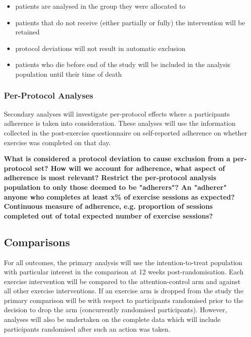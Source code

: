 \documentclass[11pt,parskip=half-]{scrartcl}
\providecommand{\tightlist}{%
  \setlength{\itemsep}{0pt}\setlength{\parskip}{0pt}}
\begin{document}
\begin{itemize}
  \tightlist
  \item patients are analysed in the group they were allocated to
  \item patients that do not receive (either partially or fully) the intervention will be retained
  \item protocol deviations will not result in automatic exclusion
  \item patients who die before end of the study  will be included in the analysis population until their time of death
\end{itemize}

\subsubsection{Per-Protocol Analyses}

Secondary analyses will investigate per-protocol effects where a participants adherence is taken into consideration. These analyses will use the information collected in the post-exercise questionnaire on self-reported adherence on whether exercise was completed on that day.

\textbf{
  What is considered a protocol deviation to cause exclusion from a per-protocol set?
  How will we account for adherence, what aspect of adherence is most relevant?
  Restrict the per-protocol analysis population to only those deemed to be "adherers"?
  An "adherer" anyone who completes at least x\% of exercise sessions as expected?
  Continuous measure of adherence, e.g. proportion of sessions completed out of total expected number of exercise sessions?
}

\subsection{Comparisons}\label{analysis-comparisons}

For all outcomes, the primary analysis will use the intention-to-treat population with particular interest in the comparison at 12 weeks post-randomisation. Each exercise intervention will be compared to the attention-control arm and against all other exercise interventions. If an exercise arm is dropped from the study the primary comparison will be with respect to participants randomised prior to the decision to drop the arm (concurrently randomised participants). However, analyses will also be undertaken on the complete data which will include participants randomised after such an action was taken.
\end{document}
